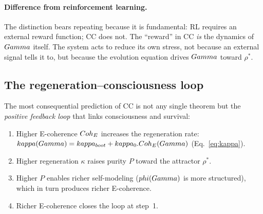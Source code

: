 \paragraph{Difference from reinforcement learning.}
The distinction bears repeating because it is fundamental: RL requires an external reward
function; CC does not.  The ``reward'' in CC \emph{is} the dynamics of $Gamma$ itself.
The system acts to reduce its own stress, not because an external signal tells it to, but
because the evolution equation drives $Gamma$ toward $\rho^*$.

\subsection{The regeneration--consciousness loop}
\label{subsec:regen-loop}

The most consequential prediction of CC is not any single theorem but the
\emph{positive feedback loop} that links consciousness and survival:

\begin{enumerate}[leftmargin=2em]
  \item Higher E-coherence $Coh_E$ increases the regeneration rate:
        $kappa(Gamma) = kappa_{boot} + kappa_0 . Coh_E(Gamma)$
        (Eq.~\ref{eq:kappa}).
  \item Higher regeneration $\kappa$ raises purity $P$ toward the attractor $\rho^*$.
  \item Higher $P$ enables richer self-modeling ($phi(Gamma)$ is more structured), which
        in turn produces richer E-coherence.
  \item Richer E-coherence closes the loop at step~1.
\end{enumerate}

